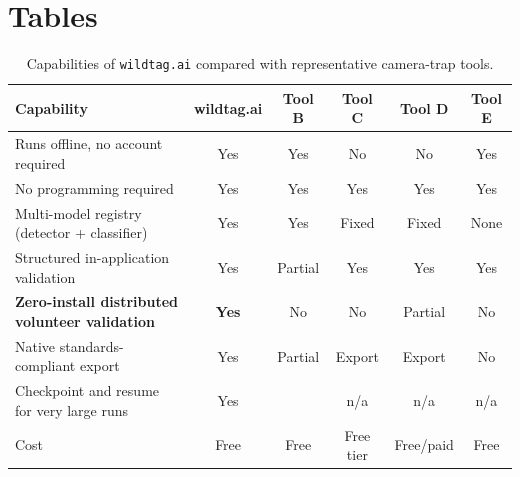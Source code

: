 \documentclass[11pt]{article}
\begin{document}
\clearpage
\section*{Tables}

\begin{table}[htbp]
\centering
\caption{Capabilities of \texttt{wildtag.ai} compared with representative
camera-trap tools. }
\label{tab:compare}
\small
\begin{tabular}{p{5.1cm} c c c c c}
\toprule
Capability & wildtag.ai & Tool B & Tool C & Tool D & Tool E \\
\midrule
Runs offline, no account required        & Yes & Yes & No  & No  & Yes \\
No programming required                  & Yes & Yes & Yes & Yes & Yes \\
Multi-model registry (detector + classifier) & Yes & Yes & Fixed & Fixed & None \\
Structured in-application validation     & Yes & Partial & Yes & Yes & Yes \\
\textbf{Zero-install distributed volunteer validation} & \textbf{Yes} & No & No & Partial & No \\
Native standards-compliant export        & Yes & Partial & Export & Export & No \\
Checkpoint and resume for very large runs & Yes & \tbd{?} & n/a & n/a & n/a \\
Cost                                     & Free & Free & Free tier & Free/paid & Free \\
\bottomrule
\end{tabular}
\end{table}
\end{document}
